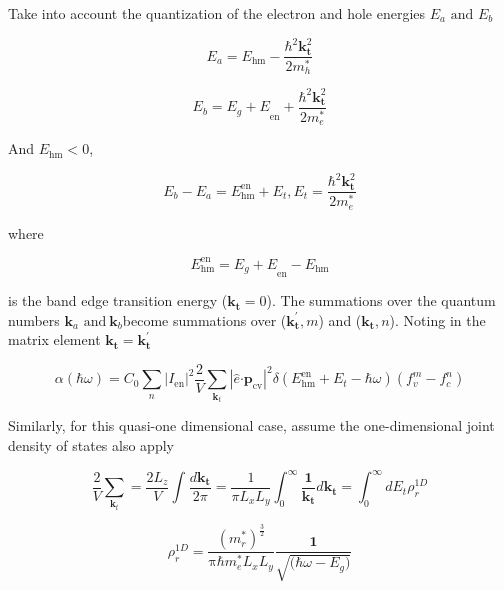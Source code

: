 Take into account the quantization of the electron and hole energies
\(E_{a}\text{\ and\ }E_{b}\)

\begin{equation}
E_{a} = E_{\text{hm}} - \frac{\hbar^{2}\bm{k}_{\bm{t}}^{2}}{2m_{h}^{*}}
\end{equation}

\begin{equation}
E_{b} = {E_{g} + E}_{\text{en}} + \frac{\hbar^{2}\bm{k}_{\bm{t}}^{2}}{2m_{e}^{*}}
\end{equation}

And \(E_{\text{hm}} < 0\),

\begin{equation}
E_{b} - E_{a} = E_{\text{hm}}^{\text{en}} + E_{t},
E_{t} = \frac{\hbar^{2}\bm{k}_{\bm{t}}^{2}}{2m_{e}^{*}}
\end{equation}

where

\begin{equation}
E_{\text{hm}}^{\text{en}} = {E_{g} + E}_{\text{en}} - E_{\text{hm}}
\end{equation}

is the band edge transition energy (\(\bm{k}_{\bm{t}} = 0\)).
The summations over the quantum numbers
\(\bm{k}_{a}\text{\ and}\bm{\ }\bm{k}_{b}\)become summations
over (\(\bm{k}_{\bm{t}}^{\bm{'}},m\)) and
(\(\bm{k}_{\bm{t}},n\)). Noting in the matrix element
\(\bm{k}_{\bm{t}}\bm{=}\bm{k}_{\bm{t}}^{\bm{'}}\)

\begin{equation}
\alpha\left( \hbar\omega \right) = C_{0}\sum_{n}^{}\left| I_{\text{en}} \right|^{2}\frac{2}{V}\sum_{\bm{k}_{t}}^{}\left| \hat{e}\bm{\cdot}\bm{p}_{\text{cv}} \right|^{2}\delta(E_{\text{hm}}^{\text{en}} + E_{t} - \hbar\omega)(f_{v}^{m} - f_{c}^{n})
\end{equation}

Similarly, for this quasi-one dimensional case, assume the
one-dimensional joint density of states also apply

\begin{equation}
\frac{2}{V}\sum_{\bm{k}_{t}}^{}{= \frac{2L_{z}}{V}}\int_{}^{}\frac{d\bm{k}_{\bm{t}}}{2\pi} = \frac{1}{\pi L_{x}L_{y}}\int_{0}^{\infty}\frac{\bm{1}}{\bm{k}_{\bm{t}}}d\bm{k}_{\bm{t}}\bm{=}\int_{0}^{\infty}{dE_{t}}\rho_{r}^{1D}
\end{equation}

\begin{equation}
\rho_{r}^{1D} = \frac{\left( m_{r}^{*} \right)^{\frac{3}{2}}}{\text{πℏ}m_{e}^{*}L_{x}L_{y}}\frac{\bm{1}}{\sqrt{\bm{(}\hbar\omega - E_{g}\bm{)}}}
\end{equation}


